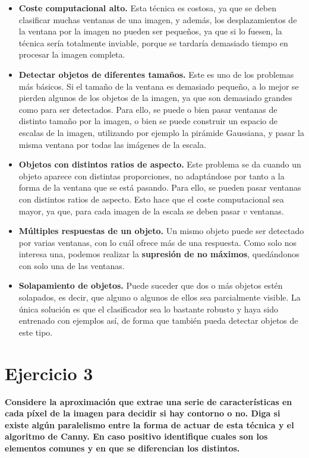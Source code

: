 \documentclass[11pt,a4paper]{article}
\newcommand{\question}[1]{\noindent\textbf{#1}}
\newcommand{\nonumsection}[1]{\section*{#1}\addcontentsline{toc}{section}{#1}}
\begin{document}
\begin{itemize}
  \item \textbf{Coste computacional alto.} Esta técnica es costosa, ya que
  se deben clasificar muchas ventanas de una imagen, y además, los desplazamientos
  de la ventana por la imagen no pueden ser pequeños, ya que si lo fuesen, la técnica
  sería totalmente inviable, porque se tardaría demasiado tiempo en procesar la imagen
  completa.
  \item \textbf{Detectar objetos de diferentes tamaños.} Este es uno de los
  problemas más básicos. Si el tamaño de la ventana es demasiado pequeño, a
  lo mejor se pierden algunos de los objetos de la imagen, ya que son demasiado
  grandes como para ser detectados. Para ello, se puede o bien pasar
  ventanas de distinto tamaño por la imagen, o bien se puede construir un
  espacio de escalas de la imagen, utilizando por ejemplo la pirámide Gaussiana,
  y pasar la misma ventana por todas las imágenes de la escala.
  \item \textbf{Objetos con distintos ratios de aspecto.} Este problema se da cuando
  un objeto aparece con distintas proporciones, no adaptándose por tanto
  a la forma de la ventana que se está pasando. Para ello, se pueden pasar
  ventanas con distintos ratios de aspecto. Esto hace que el coste computacional
  sea mayor, ya que, para cada imagen de la escala se deben pasar $v$ ventanas.
  \item \textbf{Múltiples respuestas de un objeto.} Un mismo objeto puede ser
  detectado por varias ventanas, con lo cuál ofrece más de una respuesta. Como
  solo nos interesa una, podemos realizar la \textbf{supresión de no máximos},
  quedándonos con solo una de las ventanas.
  \item \textbf{Solapamiento de objetos.} Puede suceder que dos o más objetos
  estén solapados, es decir, que alguno o algunos de ellos sea parcialmente
  visible. La única solución es que el clasificador sea lo bastante robusto
  y haya sido entrenado con ejemplos así, de forma que también pueda detectar
  objetos de este tipo.  
\end{itemize}

\nonumsection{Ejercicio 3}

\question{Considere la aproximación que extrae una serie de
características en cada píxel de la imagen para decidir si hay
contorno o no. Diga si existe algún paralelismo entre la forma de
actuar de esta técnica y el algoritmo de Canny. En caso positivo
identifique cuales son los elementos comunes y en que se diferencian
los distintos.}
\end{document}
